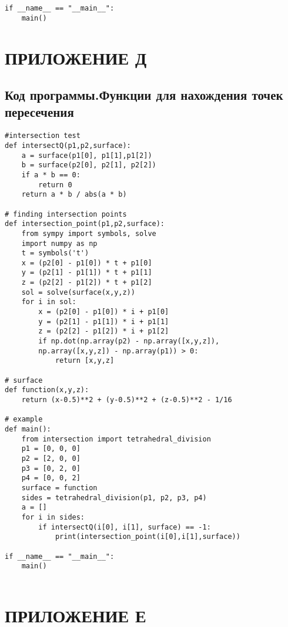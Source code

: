 \begin{footnotesize}
\begin{lstlisting}
if __name__ == "__main__":
    main()

\end{lstlisting}
\end{footnotesize}

\chapter*{ПРИЛОЖЕНИЕ Д}
\section*{\centering Код программы.Функции для нахождения точек пересечения}
\begin{footnotesize}
\begin{lstlisting}
#intersection test
def intersectQ(p1,p2,surface):
    a = surface(p1[0], p1[1],p1[2])
    b = surface(p2[0], p2[1], p2[2])
    if a * b == 0:
        return 0
    return a * b / abs(a * b)

# finding intersection points
def intersection_point(p1,p2,surface):
    from sympy import symbols, solve
    import numpy as np
    t = symbols('t')
    x = (p2[0] - p1[0]) * t + p1[0]
    y = (p2[1] - p1[1]) * t + p1[1]
    z = (p2[2] - p1[2]) * t + p1[2]
    sol = solve(surface(x,y,z))
    for i in sol:
        x = (p2[0] - p1[0]) * i + p1[0]
        y = (p2[1] - p1[1]) * i + p1[1]
        z = (p2[2] - p1[2]) * i + p1[2]
        if np.dot(np.array(p2) - np.array([x,y,z]),
        np.array([x,y,z]) - np.array(p1)) > 0:
            return [x,y,z]
        
# surface 
def function(x,y,z):
    return (x-0.5)**2 + (y-0.5)**2 + (z-0.5)**2 - 1/16
    
# example
def main():
    from intersection import tetrahedral_division
    p1 = [0, 0, 0]
    p2 = [2, 0, 0]
    p3 = [0, 2, 0]
    p4 = [0, 0, 2]
    surface = function
    sides = tetrahedral_division(p1, p2, p3, p4)
    a = []
    for i in sides:
        if intersectQ(i[0], i[1], surface) == -1:
            print(intersection_point(i[0],i[1],surface))

if __name__ == "__main__":
    main()


\end{lstlisting}
\end{footnotesize}

\chapter*{ПРИЛОЖЕНИЕ Е}
